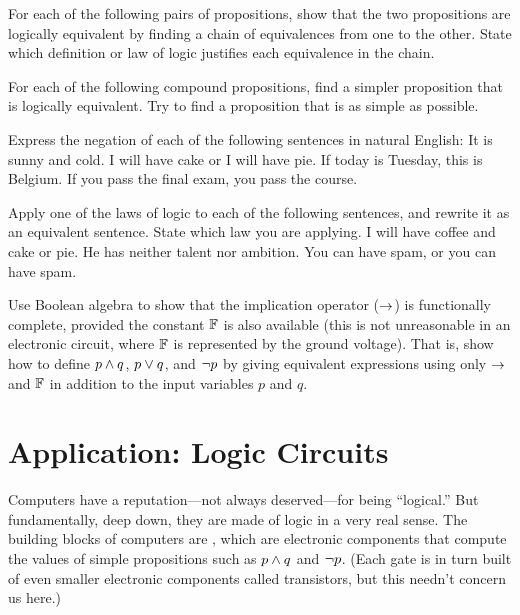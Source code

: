 \begin{exercises}
\problem For each of the following pairs of propositions, show that
the two propositions are logically equivalent by finding a chain of
equivalences from one to the other.
State which definition or law of logic justifies each equivalence in the chain.

\problem For each of the following compound propositions, find a 
simpler proposition that is logically equivalent.  Try to find a proposition
that is as simple as possible.

\problem Express the negation of each of the following sentences in
natural English:
\ppart It is sunny and cold.
\ppart I will have cake or I will have pie.
\ppart If today is Tuesday, this is Belgium.
\ppart If you pass the final exam, you pass the course.

\problem Apply one of the laws of logic to each of the
following sentences, and rewrite it as an equivalent sentence.
State which law you are applying.
\ppart I will have coffee and cake or pie.
\ppart He has neither talent nor ambition.
\ppart You can have spam, or you can have spam.

\problem Use Boolean algebra to show that the implication operator ($\rightarrow$) is functionally complete, provided the constant $\mathbb{F}$ is also available (this is not unreasonable in an electronic circuit, where $\mathbb{F}$ is represented by the ground voltage). That is, show how to define $p\wedge q$, $p\vee q$, and $\lnot p$ by giving equivalent expressions using only $\rightarrow$ and $\mathbb{F}$ in addition to the input variables $p$ and $q$.

\end{exercises}





\section{Application: Logic Circuits}\label{S-logic-3}

Computers have a reputation---not always deserved---for being ``logical.''
But fundamentally, deep down, they are made of logic in a very real
sense.  The building blocks of computers are ,
which are electronic components that compute the values of simple
propositions such as $p\wedge q$ and $\lnot p$.  (Each gate is in turn
built of even smaller electronic components called transistors,
but this needn't concern us here.)

